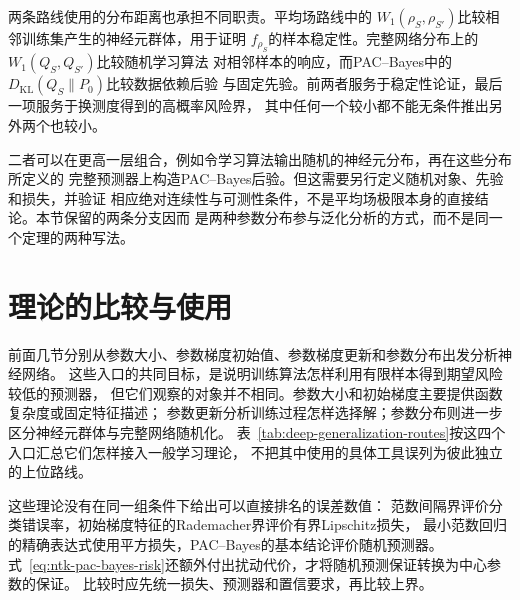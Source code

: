 两条路线使用的分布距离也承担不同职责。平均场路线中的
$W_1(\rho_S,\rho_{S'})$比较相邻训练集产生的神经元群体，用于证明
$f_{\rho_S}$的样本稳定性。完整网络分布上的$W_1(Q_S,Q_{S'})$比较随机学习算法
对相邻样本的响应，而PAC--Bayes中的$D_{\mathrm{KL}}(Q_S\|P_0)$比较数据依赖后验
与固定先验。前两者服务于稳定性论证，最后一项服务于换测度得到的高概率风险界，
其中任何一个较小都不能无条件推出另外两个也较小。

二者可以在更高一层组合，例如令学习算法输出随机的神经元分布，再在这些分布所定义的
完整预测器上构造PAC--Bayes后验。但这需要另行定义随机对象、先验和损失，并验证
相应绝对连续性与可测性条件，不是平均场极限本身的直接结论。本节保留的两条分支因而
是两种参数分布参与泛化分析的方式，而不是同一个定理的两种写法。

\FloatBarrier
\section{理论的比较与使用}
\label{sec:deep-theory-comparison}

前面几节分别从参数大小、参数梯度初始值、参数梯度更新和参数分布出发分析神经网络。
这些入口的共同目标，是说明训练算法怎样利用有限样本得到期望风险较低的预测器，
但它们观察的对象并不相同。参数大小和初始梯度主要提供函数复杂度或固定特征描述；
参数更新分析训练过程怎样选择解；参数分布则进一步区分神经元群体与完整网络随机化。
表~\ref{tab:deep-generalization-routes}按这四个入口汇总它们怎样接入一般学习理论，
不把其中使用的具体工具误列为彼此独立的上位路线。

这些理论没有在同一组条件下给出可以直接排名的误差数值：
范数间隔界评价分类错误率，初始梯度特征的Rademacher界评价有界Lipschitz损失，
最小范数回归的精确表达式使用平方损失，PAC--Bayes的基本结论评价随机预测器。
式~\eqref{eq:ntk-pac-bayes-risk}还额外付出扰动代价，才将随机预测保证转换为中心参数的保证。
比较时应先统一损失、预测器和置信要求，再比较上界。

